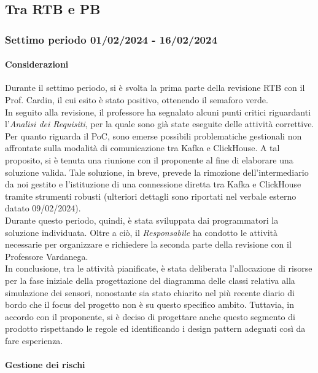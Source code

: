 \subsection{Tra RTB e PB}
\subsubsection{Settimo periodo  01/02/2024 - 16/02/2024}
\paragraph{Considerazioni}
Durante il settimo periodo, si è svolta la prima parte della revisione RTB con il Prof. Cardin, il cui esito è stato positivo, ottenendo il semaforo verde. \\
In seguito alla revisione, il professore ha segnalato alcuni punti critici riguardanti l'\textit{Analisi dei Requisiti}, per la quale sono già state eseguite delle attività correttive. \\
Per quanto riguarda il PoC, sono emerse possibili problematiche gestionali non affrontate sulla modalità di comunicazione tra Kafka e ClickHouse. A tal proposito, si è tenuta una riunione con il proponente al fine di elaborare una soluzione valida. Tale soluzione, in breve, prevede la rimozione dell'intermediario da noi gestito e l'istituzione di una connessione diretta tra Kafka e ClickHouse tramite strumenti robusti (ulteriori dettagli sono riportati nel verbale esterno datato 09/02/2024). \\
Durante questo periodo, quindi, è stata sviluppata dai programmatori la soluzione individuata. Oltre a ciò, il \textit{Responsabile} ha condotto le attività necessarie per organizzare e richiedere la seconda parte della revisione con il Professore Vardanega. \\
In conclusione, tra le attività pianificate, è stata deliberata l'allocazione di risorse per la fase iniziale della progettazione del diagramma delle classi relativa alla simulazione dei sensori, nonostante sia stato chiarito nel più recente diario di bordo che il focus del progetto non è su questo specifico ambito. Tuttavia, in accordo con il proponente, si è deciso di progettare anche questo segmento di prodotto rispettando le regole ed identificando i design pattern adeguati così da fare esperienza.
   
\paragraph{Gestione dei rischi} 

